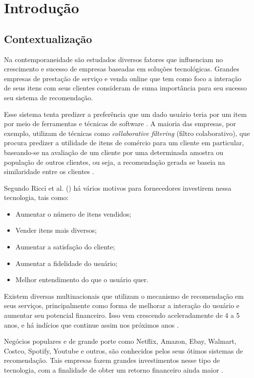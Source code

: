 \chapter{Introdução}

\section{Contextualização}

Na contemporaneidade são estudados diversos fatores que influenciam no crescimento e sucesso de empresas baseadas em soluções tecnológicas. Grandes empresas de prestação de serviço e venda online que tem como foco a interação de seus itens com seus clientes consideram de suma importância para seu sucesso seu sistema de recomendação.

Esse sistema tenta predizer a preferência que um dado usuário teria por um item por meio de ferramentas e técnicas de software \cite{souza:2014}. A maioria das empresas, por exemplo, utilizam de técnicas como \textit{collaborative filtering} (filtro colaborativo), que procura predizer a utilidade de itens de comércio para um cliente em particular, baseando-se na avaliação de um cliente por uma determinada amostra ou população de outros clientes, ou seja, a recomendação gerada se baseia na similaridade entre os clientes \cite{Linden:2003}.

Segundo Ricci et al. (\citeyear{Ricci:2010}) há vários motivos para fornecedores investirem nessa tecnologia, tais como:

\begin{itemize}
    \item Aumentar o número de itens vendidos;
    \item Vender itens mais diversos;
    \item Aumentar a satisfação do cliente;
    \item Aumentar a fidelidade do usuário;
    \item Melhor entendimento do que o usuário quer.
\end{itemize}

Existem diversas multinacionais que utilizam o mecanismo de recomendação em seus serviços, principalmente como forma de melhorar a interação do usuário e aumentar seu potencial financeiro. Isso vem crescendo aceleradamente de 4 a 5 anos, e há indícios que continue assim nos próximos anos \cite{Underwood:2017}.

Negócios populares e de grande porte como Netflix, Amazon, Ebay, Walmart, Costco, Spotify, Youtube e outros, são conhecidos pelos seus ótimos sistemas de recomendação. Tais empresas fazem grandes investimentos nesse tipo de tecnologia, com a finalidade de obter um retorno financeiro ainda maior \cite{Underwood:2017}.

